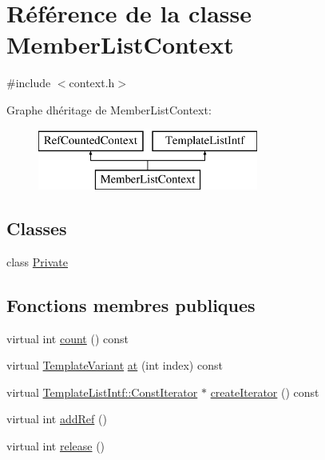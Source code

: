 \hypertarget{class_member_list_context}{}\section{Référence de la classe Member\+List\+Context}
\label{class_member_list_context}


{\ttfamily \#include $<$context.\+h$>$}

Graphe d\textquotesingle{}héritage de Member\+List\+Context\+:\begin{figure}[H]
\begin{center}
\leavevmode
\includegraphics[height=2.000000cm]{class_member_list_context}
\end{center}
\end{figure}
\subsection*{Classes}
\begin{DoxyCompactItemize}
\item 
class \hyperlink{class_member_list_context_1_1_private}{Private}
\end{DoxyCompactItemize}
\subsection*{Fonctions membres publiques}
\begin{DoxyCompactItemize}
\item 
virtual int \hyperlink{class_member_list_context_ad36cde3939dae15efb6a3d02dba88118}{count} () const 
\item 
virtual \hyperlink{class_template_variant}{Template\+Variant} \hyperlink{class_member_list_context_a9439f9dd0651c72c4be07c194819a583}{at} (int index) const 
\item 
virtual \hyperlink{class_template_list_intf_1_1_const_iterator}{Template\+List\+Intf\+::\+Const\+Iterator} $\ast$ \hyperlink{class_member_list_context_a3b3925344af0e463ce0de6086fe9a91f}{create\+Iterator} () const 
\item 
virtual int \hyperlink{class_member_list_context_a2ee8c2892871175c21a47ae4aaed9218}{add\+Ref} ()
\item 
virtual int \hyperlink{class_member_list_context_ada9f462753c6425d2912cd4cb02d4285}{release} ()
\end{DoxyCompactItemize}
